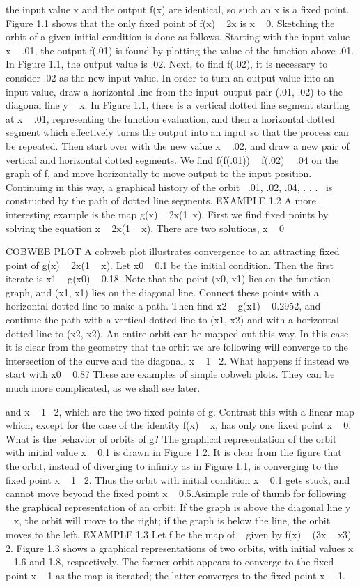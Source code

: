 \documentclass{article}
\begin{document}
the input value x and the output f(x) are identical, so such an x is a fixed point.
Figure 1.1 shows that the only fixed point of f(x)   2x is x   0.
Sketching the orbit of a given initial condition is done as follows. Starting
with the input value x   .01, the output f(.01) is found by plotting the value
of the function above .01. In Figure 1.1, the output value is .02. Next, to find
f(.02), it is necessary to consider .02 as the new input value. In order to turn an
output value into an input value, draw a horizontal line from the input–output
pair (.01, .02) to the diagonal line y   x. In Figure 1.1, there is a vertical dotted
line segment starting at x   .01, representing the function evaluation, and then
a horizontal dotted segment which effectively turns the output into an input so
that the process can be repeated.
Then start over with the new value x   .02, and draw a new pair of vertical
and horizontal dotted segments. We find f(f(.01))   f(.02)   .04 on the graph
of f, and move horizontally to move output to the input position. Continuing in
this way, a graphical history of the orbit  .01, .02, .04, . . .  is constructed by the
path of dotted line segments.
EXAMPLE 1.2
A more interesting example is the map g(x)   2x(1 x). First we find fixed
points by solving the equation x   2x(1   x). There are two solutions, x   0

COBWEB PLOT
A cobweb plot illustrates convergence to an attracting fixed point of
g(x)   2x(1   x). Let x0   0.1 be the initial condition. Then the
first iterate is x1   g(x0)   0.18. Note that the point (x0, x1) lies on
the function graph, and (x1, x1) lies on the diagonal line. Connect
these points with a horizontal dotted line to make a path. Then find
x2   g(x1)   0.2952, and continue the path with a vertical dotted
line to (x1, x2) and with a horizontal dotted line to (x2, x2). An entire
orbit can be mapped out this way.
In this case it is clear from the geometry that the orbit we are following
will converge to the intersection of the curve and the diagonal,
x   1  2. What happens if instead we start with x0   0.8? These are
examples of simple cobweb plots. They can be much more complicated,
as we shall see later.

and x   1  2, which are the two fixed points of g. Contrast this with a linear
map which, except for the case of the identity f(x)   x, has only one fixed point
x   0. What is the behavior of orbits of g? The graphical representation of the
orbit with initial value x   0.1 is drawn in Figure 1.2. It is clear from the figure
that the orbit, instead of diverging to infinity as in Figure 1.1, is converging to the
fixed point x   1  2. Thus the orbit with initial condition x   0.1 gets stuck, and
cannot move beyond the fixed point x   0.5.Asimple rule of thumb for following
the graphical representation of an orbit: If the graph is above the diagonal line
y   x, the orbit will move to the right; if the graph is below the line, the orbit
moves to the left.
EXAMPLE 1.3
Let f be the map of   given by f(x)   (3x   x3)  2. Figure 1.3 shows
a graphical representations of two orbits, with initial values x   1.6 and 1.8,
respectively. The former orbit appears to converge to the fixed point x   1 as the
map is iterated; the latter converges to the fixed point x   1.
\end{document}
